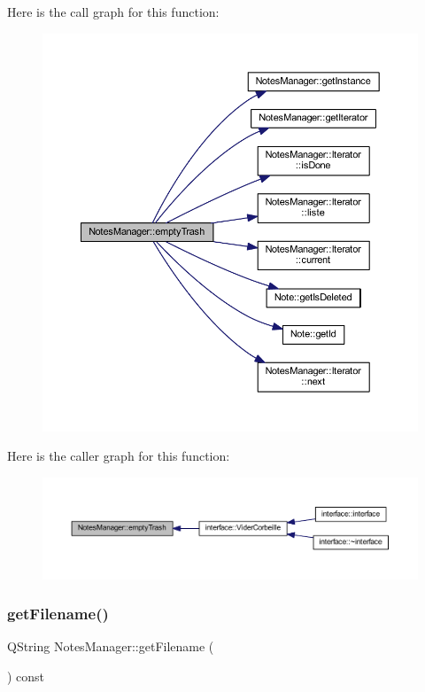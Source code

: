 Here is the call graph for this function\+:\nopagebreak
\begin{figure}[H]
\begin{center}
\leavevmode
\includegraphics[width=350pt]{class_notes_manager_a84e962ad7fa999cbb687fb43c1b3bab4_cgraph}
\end{center}
\end{figure}
Here is the caller graph for this function\+:\nopagebreak
\begin{figure}[H]
\begin{center}
\leavevmode
\includegraphics[width=350pt]{class_notes_manager_a84e962ad7fa999cbb687fb43c1b3bab4_icgraph}
\end{center}
\end{figure}
\mbox{\label{class_notes_manager_a566cbb0dd7b606ec34629a2aa8010b73}} 
\subsubsection{\texorpdfstring{get\+Filename()}{getFilename()}}
{\footnotesize\ttfamily Q\+String Notes\+Manager\+::get\+Filename (\begin{DoxyParamCaption}{ }\end{DoxyParamCaption}) const\hspace{0.3cm}{\ttfamily [inline]}}



